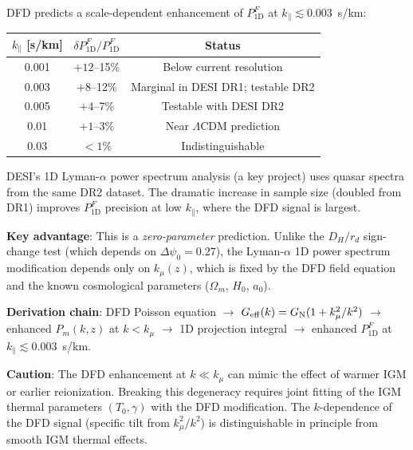 \documentclass[11pt,a4paper]{article}
\newcounter{findingctr}
\newenvironment{finding}[1][]{%
  \refstepcounter{findingctr}%
  \begin{tcolorbox}[colback=blue!3!white, colframe=blue!50!black,
    title=\textbf{Finding \thefindingctr: #1}]
}{%
  \end{tcolorbox}%
}
\newcommand{\aM}{a_0}
\newcommand{\GN}{G_{\rm N}}
\newcommand{\Omm}{\Omega_m}
\newcommand{\LCDM}{$\Lambda$CDM}
\newcommand{\Geff}{G_{\rm eff}}
\newcommand{\kmu}{k_\mu}
\begin{document}
\begin{finding}[Lyman-$\alpha$ 1D Power Spectrum: New Zero-Parameter Test]
\label{find:lya-1d}
DFD predicts a scale-dependent enhancement of $P_{1\text{D}}^F$ at
$k_\parallel \lesssim 0.003$~s/km:

\begin{center}
\begin{tabular}{ccc}
\toprule
$k_\parallel$ [s/km] & $\delta P_{1\text{D}}^F / P_{1\text{D}}^F$ & Status \\
\midrule
0.001 & $+12$--15\% & Below current resolution \\
0.003 & $+8$--12\% & Marginal in DESI DR1; testable DR2 \\
0.005 & $+4$--7\% & Testable with DESI DR2 \\
0.01 & $+1$--3\% & Near \LCDM{} prediction \\
0.03 & $<1\%$ & Indistinguishable \\
\bottomrule
\end{tabular}
\end{center}

DESI's 1D Lyman-$\alpha$ power spectrum analysis (a key project)
uses quasar spectra from the same DR2 dataset. The dramatic increase
in sample size (doubled from DR1) improves $P_{1\text{D}}^F$ precision
at low $k_\parallel$, where the DFD signal is largest.

\textbf{Key advantage}: This is a \emph{zero-parameter} prediction.
Unlike the $D_H/r_d$ sign-change test (which depends on
$\Delta\psi_0 = 0.27$), the Lyman-$\alpha$ 1D power spectrum
modification depends only on $\kmu(z)$, which is fixed by the
DFD field equation and the known cosmological parameters
($\Omm$, $H_0$, $\aM$).

\textbf{Derivation chain}: DFD Poisson equation $\to$ $\Geff(k) =
\GN(1 + \kmu^2/k^2)$ $\to$ enhanced $P_m(k,z)$ at $k < \kmu$
$\to$ 1D projection integral $\to$ enhanced $P_{1\text{D}}^F$ at
$k_\parallel \lesssim 0.003$~s/km.

\textbf{Caution}: The DFD enhancement at $k \ll \kmu$ can mimic
the effect of warmer IGM or earlier reionization. Breaking this
degeneracy requires joint fitting of the IGM thermal parameters
$(T_0, \gamma)$ with the DFD modification. The $k$-dependence of
the DFD signal (specific tilt from $\kmu^2/k^2$) is distinguishable
in principle from smooth IGM thermal effects.
\end{finding}


\end{document}
